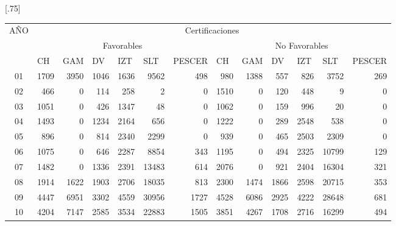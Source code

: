 \documentclass[12pt]{article}
\begin{document}
\begin{table}[ht]
\centering
\scalebox{0.75}[.75]{
\begin{tabular}{||c||rrrrrr||rrrrrr||}
\hline\hline
\multicolumn{1}{||c||}{\multirow{3}{*}{AÑO}} & \multicolumn{12}{c||}{Certificaciones}                                                                                                                                                                                                                                                                                               \\ \cline{2-13} 
\multicolumn{1}{||c||}{}& \multicolumn{6}{c||}{Favorables}                                                                                                                                  & \multicolumn{6}{c||}{No Favorables}                                                                                                                               \\ \cline{2-13} 
\multicolumn{1}{||c||}{}& \multicolumn{1}{l|}{CH} & \multicolumn{1}{l|}{GAM} & \multicolumn{1}{l|}{DV} & \multicolumn{1}{l|}{IZT} & \multicolumn{1}{l|}{SLT} & \multicolumn{1}{l||}{PESCER} & \multicolumn{1}{l|}{CH} & \multicolumn{1}{l|}{GAM} & \multicolumn{1}{l|}{DV} & \multicolumn{1}{l|}{IZT} & \multicolumn{1}{l|}{SLT} & \multicolumn{1}{l||}{PESCER} \\ \hline
01 &  1709 & 3950 & 1046 & 1636 & 9562 & 498&  980 & 1388 &  557 &  826 & 3752  &  269\\
  02 & 466 & 0 & 114 & 258 & 2 & 0& 1510 &    0  & 120 &  448 &    9  &    0\\
  03 & 1051 & 0 & 426 & 1347 & 48 & 0 & 1062 &    0  & 159 &  996 &   20  &    0\\
  04 & 1493 & 0 & 1234 & 2164 & 656 & 0& 1222 &    0  & 289 & 2548 &  538  &    0\\
  05 & 896 & 0 & 814 & 2340 & 2299 & 0&  939 &    0  & 465 & 2503 & 2309  &    0\\
  06 & 1075 & 0 & 646 & 2287 & 8854 & 343& 1195 &    0  & 494 & 2325 &10799  &  129\\
  07 & 1482 & 0 & 1336 & 2391 & 13483 & 614& 2076 &    0  & 921 & 2404 &16304  &  321\\
  08 & 1914 & 1622 & 1903 & 2706 & 18035 & 813& 2300 & 1474 & 1866 & 2598 &20715  &  353\\
  09 & 4447 & 6951&3302&  4559 &30956 &  1727& 4528 & 6086 & 2925 & 4222 &28648   &681\\
  10 & 4204 & 7147 & 2585 & 3534& 22883 &  1505& 3851 & 4267 & 1708 & 2716 &16299  &  494\\

\end{tabular}}
\end{table}
\end{document}

